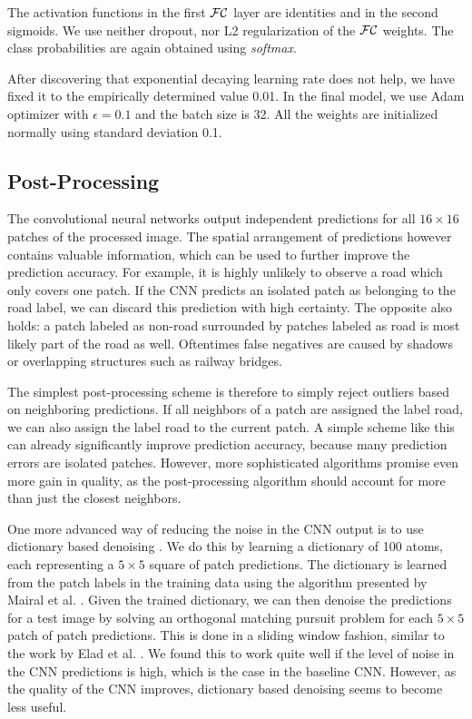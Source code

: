 \documentclass[10pt,conference,compsocconf]{IEEEtran}
\begin{document}
The activation functions in the first $ \cal{FC} $ layer are identities and in the second sigmoids. We use neither dropout, nor L2 regularization of the $ \cal{FC} $ weights. The class probabilities are again obtained using \textit{softmax}.

After discovering that exponential decaying learning rate does not help, we have fixed it to the empirically determined value 0.01. 
In the final model, we use Adam optimizer with $ \epsilon = 0.1 $ and the batch size is 32. All the weights are initialized normally using standard deviation 0.1.


\subsection{Post-Processing}
The convolutional neural networks output independent predictions for all $ 16 \times 16 $ patches of the processed image. The spatial arrangement of predictions however contains valuable information, which can be used to further improve the prediction accuracy. For example, it is highly unlikely to observe a road which only covers one patch. If the CNN predicts an isolated patch as belonging to the road label, we can discard this prediction with high certainty. The opposite also holds: a patch labeled as non-road surrounded by patches labeled as road is most likely part of the road as well. Oftentimes false negatives are caused by shadows or overlapping structures such as railway bridges.

\par 
The simplest post-processing scheme is therefore to simply reject outliers based on neighboring predictions. If all neighbors of a patch are assigned the label road, we can also assign the label road to the current patch. A simple scheme like this can already significantly improve prediction accuracy, because many prediction errors are isolated patches. However, more sophisticated algorithms promise even more gain in quality, as the post-processing algorithm should account for more than just the closest neighbors.

\par 
One more advanced way of reducing the noise in the CNN output is to use dictionary based denoising \cite{Elad.2006}. We do this by learning a dictionary of 100 atoms, each representing a  $ 5 \times 5 $ square of patch predictions. The dictionary is learned from the patch labels in the training data using the algorithm presented by Mairal et al. \cite{Mairal.2009}. Given the trained dictionary, we can then denoise the predictions for a test image by solving an orthogonal matching pursuit problem for each $ 5 \times 5 $ patch of patch predictions. This is done in a sliding window fashion, similar to the work by Elad et al. \cite{Elad.2006}. We found this to work quite well if the level of noise in the CNN predictions is high, which is the case in the baseline CNN. However, as the quality of the CNN improves, dictionary based denoising seems to become less useful.
\end{document}

